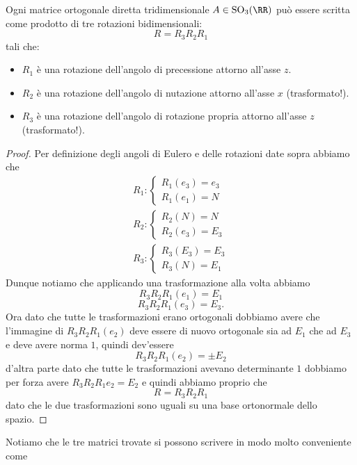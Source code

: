 \documentclass[11pt]{scrartcl}
\newcommand{\SO}{\text{SO}}
\begin{document}
   	 \begin{theorem}
   	 	Ogni matrice ortogonale diretta tridimensionale $A\in \SO_3(\RR)$ può essere scritta come prodotto di tre rotazioni bidimensionali:
   	 	$$R=R_3R_2R_1$$
   	 	tali che:
   	 	\begin{itemize}
   	 		\item $R_1$ è una rotazione dell'angolo di precessione attorno all'asse $z$. 
   	 		\item $R_2$ è una rotazione dell'angolo di nutazione attorno all'asse $x$ (trasformato!).
   	 		\item $R_3$ è una rotazione dell'angolo di rotazione propria attorno all'asse $z$ (trasformato!).
   	 	\end{itemize}
   	 \end{theorem}
   	 \begin{proof}
   	 	Per definizione degli angoli di Eulero e delle rotazioni date sopra abbiamo che
   	 	\begin{gather*}
   	 		R_1:
   	 		\begin{cases}
   	 			R_1(e_3)=e_3 \\
   	 			R_1(e_1)=N
   	 		\end{cases} \\
   	 		R_2:\begin{cases}
   	 			R_2(N)=N \\
   	 			R_2(e_3)=E_3 
   	 		\end{cases} \\
   	 		R_3:\begin{cases}
   	 			R_3(E_3)=E_3 \\
   	 			R_3(N)= E_1
   	 		\end{cases}
   	 	\end{gather*}
   	 	Dunque notiamo che applicando una trasformazione alla volta abbiamo
   	 	$$R_3R_2R_1(e_1)=E_1$$
   	 	$$R_3R_2R_1(e_3)=E_3.$$
   	 	Ora dato che tutte le trasformazioni erano ortogonali dobbiamo avere che l'immagine di $R_3R_2R_1(e_2)$ deve essere di nuovo ortogonale sia ad $E_1$ che ad $E_3$ e deve avere norma $1$, quindi dev'essere
   	 	$$R_3R_2R_1(e_2)=\pm E_2$$
   	 	d'altra parte dato che tutte le trasformazioni avevano determinante $1$ dobbiamo per forza avere $R_3R_2R_1e_2=E_2$ e quindi abbiamo proprio che 
   	 	$$R=R_3R_2R_1$$
   	 	dato che le due trasformazioni sono uguali su una base ortonormale dello spazio.
   	 \end{proof}
   	 Notiamo che le tre matrici trovate si possono scrivere in modo molto conveniente come
\end{document}
